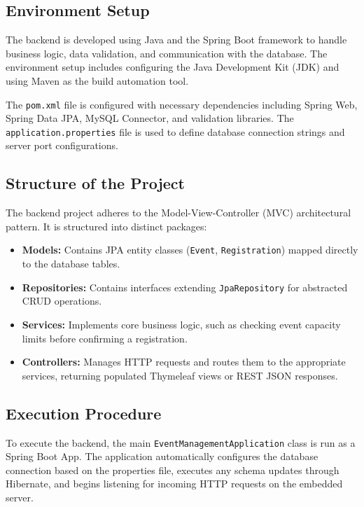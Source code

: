 \documentclass[10pt]{report}
\begin{document}
\subsection{Environment Setup}
The backend is developed using Java and the Spring Boot framework to handle business logic, data validation, and communication with the database. The environment setup includes configuring the Java Development Kit (JDK) and using Maven as the build automation tool. 

The \texttt{pom.xml} file is configured with necessary dependencies including Spring Web, Spring Data JPA, MySQL Connector, and validation libraries. The \texttt{application.properties} file is used to define database connection strings and server port configurations.

\subsection{Structure of the Project}
The backend project adheres to the Model-View-Controller (MVC) architectural pattern. It is structured into distinct packages:
\begin{itemize}
    \item \textbf{Models:} Contains JPA entity classes (\texttt{Event}, \texttt{Registration}) mapped directly to the database tables.
    \item \textbf{Repositories:} Contains interfaces extending \texttt{JpaRepository} for abstracted CRUD operations.
    \item \textbf{Services:} Implements core business logic, such as checking event capacity limits before confirming a registration.
    \item \textbf{Controllers:} Manages HTTP requests and routes them to the appropriate services, returning populated Thymeleaf views or REST JSON responses.
\end{itemize}

\subsection{Execution Procedure}
To execute the backend, the main \texttt{EventManagementApplication} class is run as a Spring Boot App. The application automatically configures the database connection based on the properties file, executes any schema updates through Hibernate, and begins listening for incoming HTTP requests on the embedded server.

\end{document}
